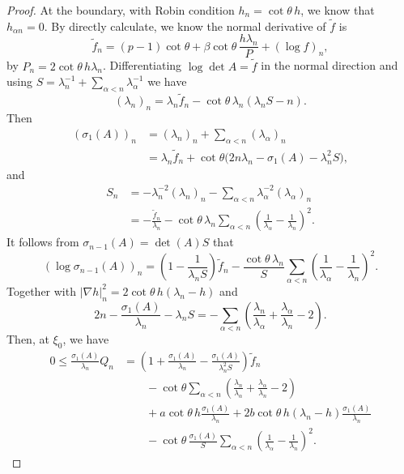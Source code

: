 \documentclass[10pt,a4paper]{amsart}
\begin{document}
\begin{proof}
At the boundary, with Robin condition $h_n=\cot\theta\,h$, we know that $h_{\alpha n}=0$.
By directly calculate, we know the normal derivative of $\tilde{f}$ is 
\[
        \tilde f_n
        =(p-1)\cot\theta
        +\beta\cot\theta\,
        \frac{h\lambda_n}{P}
        +(\log f)_n,
\]
by $P_n=2\cot\theta\,h\lambda_n$. Differentiating
$\log\det A=\tilde f$ in the normal direction and using
$S=\lambda_n^{-1}+\sum_{\alpha<n}\lambda_{\alpha}^{-1}$ we have
\[
        (\lambda_n)_n
        =\lambda_n\tilde f_n
        -\cot\theta\,\lambda_n(\lambda_nS-n).
\]
Then
\[
\begin{split}
        (\sigma_1(A))_n
        &=(\lambda_n)_n+\sum_{\alpha<n}(\lambda_{\alpha})_n\\
        &=\lambda_n\tilde f_n
        +\cot\theta\bigl(2n\lambda_n-\sigma_1(A)-\lambda_n^2S\bigr),
\end{split}
\]
and
\[
\begin{split}
        S_n
        &=-\lambda_n^{-2}(\lambda_n)_n
        -\sum_{\alpha<n}\lambda_{\alpha}^{-2}(\lambda_{\alpha})_n\\
        &=-\frac{\tilde f_n}{\lambda_n}
        -\cot\theta\,\lambda_n
        \sum_{\alpha<n}\left(\frac1{\lambda_{\alpha}}
        -\frac1{\lambda_n}\right)^2.
\end{split}
\]
It follows from $\sigma_{n-1}(A)=\det(A)S$ that
\[
        (\log\sigma_{n-1}(A))_n
        =\left(1-\frac1{\lambda_nS}\right)\tilde f_n
        -\frac{\cot\theta\,\lambda_n}{S}
        \sum_{\alpha<n}\left(\frac1{\lambda_{\alpha}}
        -\frac1{\lambda_n}\right)^2.
\]
Together with $|\nabla h|^2_n=2\cot\theta\,h(\lambda_n-h)$ and
\[
        2n-\frac{\sigma_1(A)}{\lambda_n}-\lambda_nS
        =-\sum_{\alpha<n}\left(\frac{\lambda_n}{\lambda_{\alpha}}
        +\frac{\lambda_{\alpha}}{\lambda_n}-2\right). 
\]
Then, at $\xi_0$, we have
\begin{equation}\label{boundary Q derivative}
\begin{split}
        0\leq \frac{\sigma_1(A)}{\lambda_n}Q_n
        &=\left(1+\frac{\sigma_1(A)}{\lambda_n}
        -\frac{\sigma_1(A)}{\lambda_n^2S}\right)\tilde f_n\\
        &\qquad
        -\cot\theta
        \sum_{\alpha<n}\left(\frac{\lambda_n}{\lambda_{\alpha}}
        +\frac{\lambda_{\alpha}}{\lambda_n}-2\right)\\
        &\qquad
        +a\cot\theta\,h\frac{\sigma_1(A)}{\lambda_n}
        +2b\cot\theta\,h(\lambda_n-h)\frac{\sigma_1(A)}{\lambda_n}\\
        &\qquad
        -\cot\theta\,\frac{\sigma_1(A)}{S}
        \sum_{\alpha<n}\left(\frac1{\lambda_{\alpha}}
        -\frac1{\lambda_n}\right)^2.
\end{split}
\end{equation}


\end{proof}
\end{document}

